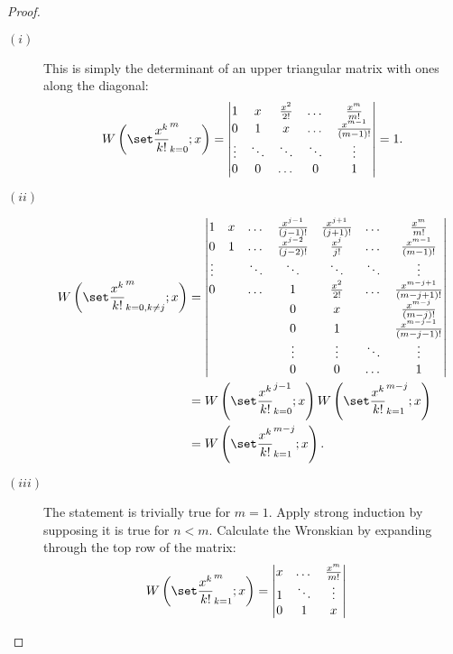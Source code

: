\documentclass{article}
\begin{document}
\begin{proof}
\begin{description}
\item[$(i)$] This is simply the determinant of an upper triangular matrix with ones along the diagonal:
\begin{equation*}
\Wpoly{k=0}{m} = \begin{vmatrix} 1 & x & \Poly{2} & \dots & \Poly{m} \\
0 & 1 & x & \dots & \poly{m-1} \\
\vdots & \ddots & \ddots & \ddots & \vdots \\
0 & 0 & \dots & 0 & 1 \end{vmatrix} = 1 .
\end{equation*}
\item[$(ii)$] \begin{align*}
\Wpoly{k=0,k \neq j}{m} & =
\begin{vmatrix}
1      & x & \dots  & \poly{j-1} & \poly{j+1} & \dots & \Poly{m}    \\
0      & 1 & \dots  & \poly{j-2} & \Poly{j}   & \dots & \poly{m-1}  \\
\vdots &   & \ddots & \ddots     & \ddots     & \ddots& \vdots      \\
0      &   & \dots  & 1          & \Poly{2}   & \dots & \poly{m-j+1}\\
       &   &        & 0          & x          &       & \poly{m-j}  \\
       &   &        & 0          & 1          &       & \poly{m-j-1}\\
       &   &        & \vdots     & \vdots     & \ddots& \vdots      \\
       &   &        & 0          & 0          & \dots & 1
\end{vmatrix} \\
& = \Wpoly{k=0}{j-1} \Wpoly{k=1}{m-j} \\
& = \Wpoly{k=1}{m-j} .
\end{align*}
\item[$(iii)$] The statement is trivially true for $m=1$.
Apply strong induction by supposing it is true for $n<m$.
Calculate the Wronskian by expanding through the top row of the matrix:
\begin{align*}
\Wpoly{k=1}{m} & = \begin{vmatrix}
x & \dots & \Poly{m} \\
1 & \ddots & \vdots \\
0 & 1 & x \end{vmatrix}

\end{align*}
\end{description}
\end{proof}
\end{document}
